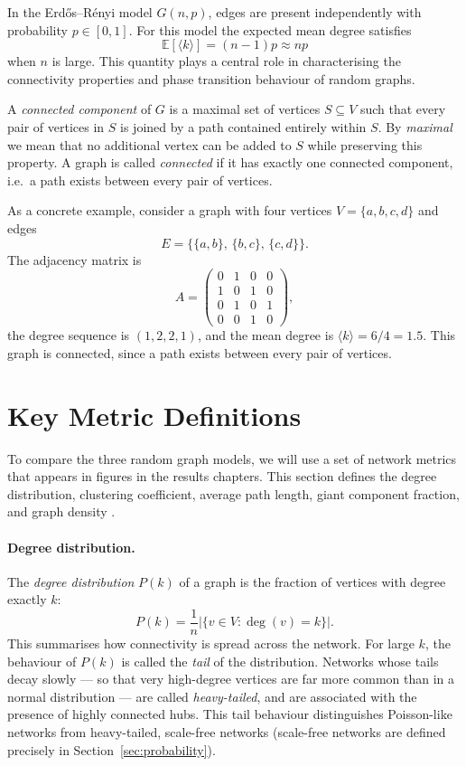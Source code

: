 \documentclass[12pt, a4paper]{report}
\theoremstyle{definition}
\theoremstyle{plain}
\theoremstyle{remark}
\begin{document}
In the Erd\H{o}s--R\'enyi model $G(n,p)$, edges are present 
independently with probability $p \in [0,1]$. For this 
model the expected mean degree satisfies
\[
  \mathbb{E}[\langle k \rangle] = (n-1)p \approx np
\]
when $n$ is large. This quantity plays a central role in 
characterising the connectivity properties and phase 
transition behaviour of random graphs.

A \emph{connected component} of $G$ is a maximal set of
vertices $S \subseteq V$ such that every pair of vertices in $S$
is joined by a path contained entirely within $S$. By
\emph{maximal} we mean that no additional vertex can be added to
$S$ while preserving this property. A graph is called
\emph{connected} if it has exactly one connected component,
i.e.\ a path exists between every pair of vertices.

As a concrete example, consider a graph with four vertices 
$V = \{a,b,c,d\}$ and edges
\[
  E = \bigl\{\{a,b\},\, \{b,c\},\, \{c,d\}\bigr\}.
\]
The adjacency matrix is
\[
  A =
  \begin{pmatrix}
    0 & 1 & 0 & 0 \\
    1 & 0 & 1 & 0 \\
    0 & 1 & 0 & 1 \\
    0 & 0 & 1 & 0
  \end{pmatrix},
\]
the degree sequence is $(1,2,2,1)$, and the mean degree 
is $\langle k \rangle = 6/4 = 1.5$. This graph is connected,
since a path exists between every pair of vertices.

\section{Key Metric Definitions}
\label{sec:metrics}

To compare the three random graph models, we will use 
a set of network metrics that appears in figures in
the results chapters. This section defines the degree 
distribution, clustering coefficient, average path length, 
giant component fraction, and graph density
\cite{hofstad2017, albert2002}.

\paragraph{Degree distribution.}
The \emph{degree distribution} $P(k)$ of a graph is the 
fraction of vertices with degree exactly $k$:
\[
  P(k) = \frac{1}{n} \bigl|\{v \in V : \deg(v) = k\}\bigr|.
\]
This summarises how connectivity is spread across the network.
For large $k$, the behaviour of $P(k)$ is called the
\emph{tail} of the distribution. Networks whose tails decay
slowly --- so that very high-degree vertices are far more
common than in a normal distribution --- are called
\emph{heavy-tailed}, and are associated with the presence of
highly connected hubs. This tail behaviour distinguishes
Poisson-like networks from heavy-tailed, scale-free networks
(scale-free networks are defined precisely in
Section~\ref{sec:probability}).
\end{document}
